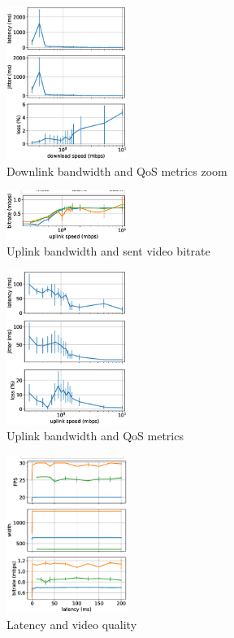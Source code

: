 \begin{figure}[]
    \includegraphics[width=0.35\textwidth,keepaspectratio]{../figures/static/downlink_latency_zoom.eps}
    \caption{Downlink bandwidth and QoS metrics zoom}
    \label{fig:downlink_qos}
\end{figure}


\begin{figure}[]
    \includegraphics[width=0.35\textwidth,keepaspectratio]{../figures/static/uplink_qos_meet_teams_zoom.eps}
    \caption{Uplink bandwidth and sent video bitrate}
    \label{fig:uplink_bitrate}
\end{figure}


\begin{figure}[]
    \includegraphics[width=0.35\textwidth,keepaspectratio]{../figures/static/uplink_latency_zoom.eps}
    \caption{Uplink bandwidth and QoS metrics}
    \label{fig:uplink_qos}
\end{figure}


\begin{figure}[]
    \includegraphics[width=0.35\textwidth,keepaspectratio]{../figures/static/latency_qos_meet_teams_zoom.eps}
    \caption{Latency and video quality}
    \label{fig:latency_video_qual}
\end{figure}


